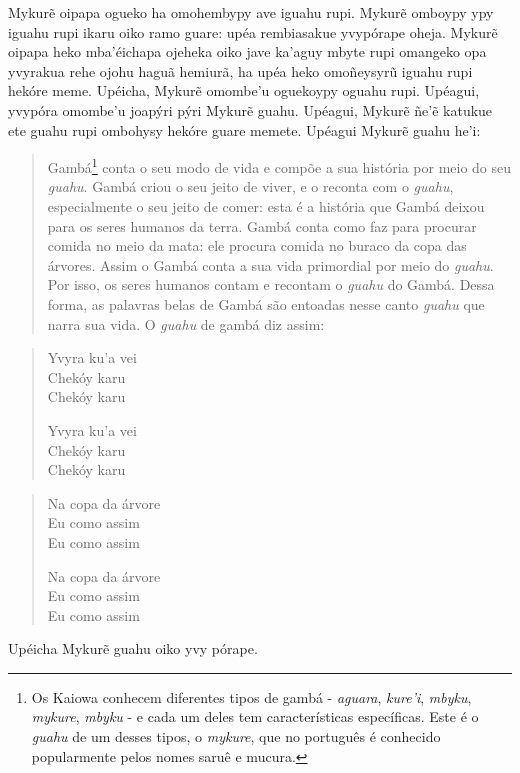 \begin{itemize}
Mykurẽ oipapa ogueko ha omohembypy ave iguahu rupi. Mykurẽ omboypy ypy
iguahu rupi ikaru oiko ramo guare: upéa rembiasakue yvypórape oheja.
Mykurẽ oipapa heko mba'éichapa ojeheka oiko jave ka'aguy mbyte rupi
omangeko opa yvyrakua rehe ojohu haguã hemiurã, ha upéa heko omoñeysyrũ
iguahu rupi hekóre meme. Upéicha, Mykurẽ omombe'u oguekoypy oguahu rupi.
Upéagui, yvypóra omombe'u joapýri pýri Mykurẽ guahu. Upéagui, Mykurẽ
ñe'ẽ katukue ete guahu rupi ombohysy hekóre guare memete. Upéagui Mykurẽ
guahu he'i:

\begin{quote}
Gambá\footnote{Os Kaiowa conhecem diferentes tipos de gambá -
  \emph{aguara}, \emph{kure'i}, \emph{mbyku}, \emph{mykure},
  \emph{mbyku} - e cada um deles tem características específicas. Este é
  o \emph{guahu} de um desses tipos, o \emph{mykure}, que no português é
  conhecido popularmente pelos nomes saruê e mucura.} conta o seu modo
de vida e compõe a sua história por meio do seu \emph{guahu}. Gambá
criou o seu jeito de viver, e o reconta com o \emph{guahu},
especialmente o seu jeito de comer: esta é a história que Gambá deixou
para os seres humanos da terra. Gambá conta como faz para procurar
comida no meio da mata: ele procura comida no buraco da copa das
árvores. Assim o Gambá conta a sua vida primordial por meio do
\emph{guahu}. Por isso, os seres humanos contam e recontam o
\emph{guahu} do Gambá. Dessa forma, as palavras belas de Gambá são
entoadas nesse canto \emph{guahu} que narra sua vida. O \emph{guahu} de
gambá diz assim:
\end{quote}


\begin{verse}
Yvyra ku'a vei\\
Chekóy karu\\
Chekóy karu

Yvyra ku'a vei\\
Chekóy karu\\
Chekóy karu
\end{verse}

\begin{verse}
Na copa da árvore\\
Eu como assim\\
Eu como assim

Na copa da árvore\\
Eu como assim\\
Eu como assim
\end{verse}

Upéicha Mykurẽ guahu oiko yvy pórape.


\end{itemize}
